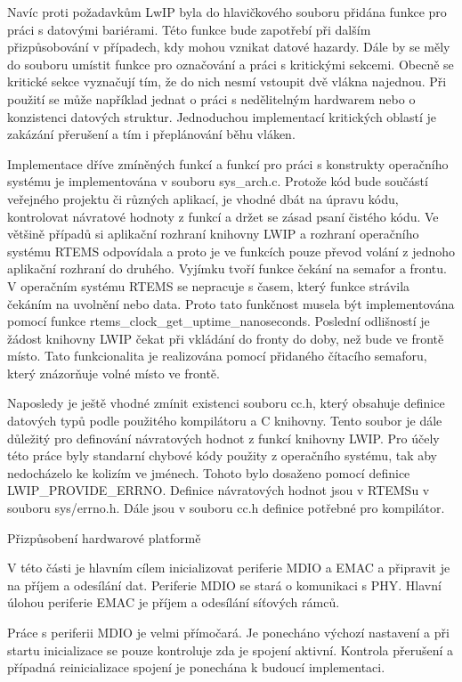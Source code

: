 Navíc proti požadavkům LwIP byla do hlavičkového souboru přidána funkce pro práci s datovými bariérami.
Této funkce bude zapotřebí při dalším přizpůsobování v případech, kdy mohou vznikat datové hazardy.
Dále by se měly do souboru umístit funkce pro označování a práci s kritickými sekcemi.
Obecně se kritické sekce vyznačují tím, že do nich nesmí vstoupit dvě vlákna najednou.
Při použití se může například jednat o práci s nedělitelným hardwarem nebo o konzistenci datových struktur.
Jednoduchou implementací kritických oblastí je zakázání přerušení a tím i přeplánování běhu vláken.

Implementace dříve zmíněných funkcí a funkcí pro práci s konstrukty operačního systému je implementována v souboru sys\_arch.c.
Protože kód bude součástí veřejného projektu či různých aplikací, je vhodné dbát na úpravu kódu, kontrolovat návratové hodnoty z funkcí a držet se zásad psaní čistého kódu.
Ve většině případů si aplikační rozhraní knihovny LWIP a rozhraní operačního systému RTEMS odpovídala a proto je ve funkcích pouze převod volání z jednoho aplikační rozhraní do druhého.
Vyjímku tvoří funkce čekání na semafor a frontu.
V operačním systému RTEMS se nepracuje s časem, který funkce strávila čekáním na uvolnění nebo data.
Proto tato funkčnost musela být implementována pomocí funkce rtems\_clock\_get\_uptime\_nanoseconds.
Poslední odlišností je žádost knihovny LWIP čekat při vkládání do fronty do doby, než bude ve frontě místo.
Tato funkcionalita je realizována pomocí přidaného čítacího semaforu, který znázorňuje volné místo ve frontě.

Naposledy je ještě vhodné zmínit existenci souboru cc.h, který obsahuje definice datových typů podle použitého kompilátoru a C knihovny.
Tento soubor je dále důležitý pro definování návratových hodnot z funkcí knihovny LWIP.
Pro účely této práce byly standarní chybové kódy použity z operačního systému, tak aby nedocházelo ke kolizím ve jménech.
Tohoto bylo dosaženo pomocí definice LWIP\_PROVIDE\_ERRNO.
Definice návratových hodnot jsou v RTEMSu v souboru sys/errno.h.
Dále jsou v souboru cc.h definice potřebné pro kompilátor.

\secc Přizpůsobení hardwarové platformě

V této části je hlavním cílem inicializovat periferie MDIO a EMAC a připravit je na příjem a odesílání dat.
Periferie MDIO se stará o komunikaci s PHY.
Hlavní úlohou periferie EMAC je příjem a odesílání síťových rámců. 

Práce s periferii MDIO je velmi přímočará.
Je ponecháno výchozí nastavení a při startu inicializace se pouze kontroluje zda je spojení aktivní.
Kontrola přerušení a případná reinicializace spojení je ponechána k budoucí implementaci.

